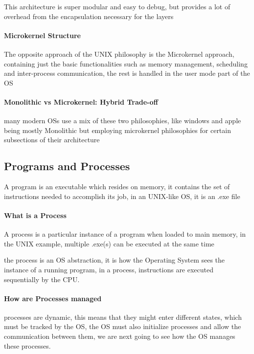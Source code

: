 \documentclass[openright, twoside]{report}
\theoremstyle{definition}
\theoremstyle{example}
\begin{document}
					This architecture is super modular and easy to debug, but provides a 
					lot of overhead from the encapsulation necessary for the layers
				
					\paragraph{Microkernel Structure} The opposite approach of the UNIX 
					philosophy is the Microkernel approach, containing just the basic 
					functionalities such as memory management, scheduling 
					and inter-process communication, the rest is handled in the user mode 
					part of the OS

					\paragraph{Monolithic vs Microkernel: Hybrid Trade-off} many modern 
					OSs use a mix of these two philosophies, like windows and apple being 
					mostly Monolithic but employing microkernel philosophies
					for certain subsections of their architecture 

				\subsection{Programs and Processes}	
					\label{ssec:proc}
					A program is an executable which resides on memory, 
					it contains the set of instructions needed to accomplish its job, 
					in an UNIX-like OS, it is an .exe file

					\paragraph{What is a Process}A process is a particular instance of a 
					program when loaded to main memory, in the UNIX example, 
					multiple .exe(s) can be executed at the same time

					the process is an OS abstraction, it is how the Operating System 
					sees the instance of a running program, in a process, instructions are
					executed sequentially by the CPU.

					\paragraph{How are Processes managed} processes are dynamic, this 
					means that they might enter different states, which must be tracked 
					by the OS, the OS must also initialize
					processes and allow the communication between them, we are next going 
					to see how the OS manages these processes.
\end{document}
